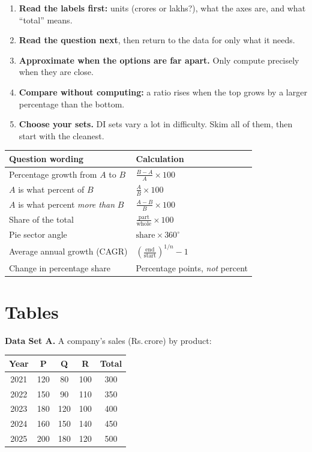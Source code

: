 \documentclass[11pt,a4paper,openany]{report}
\newcommand{\Rs}{Rs.\,}
\begin{document}
\begin{idea}
\begin{enumerate}[nosep]
\item \textbf{Read the labels first:} units (crores or lakhs?), what the axes are, and what ``total'' means.
\item \textbf{Read the question next}, then return to the data for only what it needs.
\item \textbf{Approximate when the options are far apart.} Only compute precisely when they are close.
\item \textbf{Compare without computing:} a ratio rises when the top grows by a larger percentage than the bottom.
\item \textbf{Choose your sets.} DI sets vary a lot in difficulty. Skim all of them, then start with the cleanest.
\end{enumerate}
\end{idea}

\begin{center}\small
\begin{tabular}{>{\raggedright}p{5.2cm}>{\raggedright\arraybackslash}p{9cm}}
\toprule
Question wording & Calculation\\\midrule
Percentage growth from $A$ to $B$ & $\frac{B-A}{A}\times100$\\
$A$ is what percent of $B$ & $\frac AB\times100$\\
$A$ is what percent \emph{more than} $B$ & $\frac{A-B}B\times100$\\
Share of the total & $\frac{\text{part}}{\text{whole}}\times100$\\
Pie sector angle & $\text{share}\times360^\circ$\\
Average annual growth (CAGR) & $\left(\frac{\text{end}}{\text{start}}\right)^{1/n}-1$\\
Change in percentage share & Percentage points, \emph{not} percent\\
\bottomrule
\end{tabular}
\end{center}

\section{Tables}
\textbf{Data Set A.} A company's sales (\Rs crore) by product:
\begin{center}
\begin{tabular}{cccc|c}
\toprule
Year & P & Q & R & Total\\\midrule
2021 & 120 & 80 & 100 & 300\\
2022 & 150 & 90 & 110 & 350\\
2023 & 180 & 120 & 100 & 400\\
2024 & 160 & 150 & 140 & 450\\
2025 & 200 & 180 & 120 & 500\\
\bottomrule
\end{tabular}
\end{center}
\end{document}
